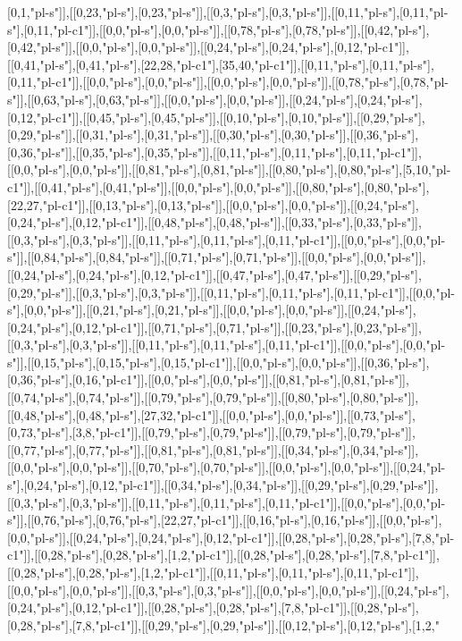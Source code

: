 [0,1,"pl-s"]],[[0,23,"pl-s"],[0,23,"pl-s"]],[[0,3,"pl-s"],[0,3,"pl-s"]],[[0,11,"pl-s"],[0,11,"pl-s"],[0,11,"pl-c1"]],[[0,0,"pl-s"],[0,0,"pl-s"]],[[0,78,"pl-s"],[0,78,"pl-s"]],[[0,42,"pl-s"],[0,42,"pl-s"]],[[0,0,"pl-s"],[0,0,"pl-s"]],[[0,24,"pl-s"],[0,24,"pl-s"],[0,12,"pl-c1"]],[[0,41,"pl-s"],[0,41,"pl-s"],[22,28,"pl-c1"],[35,40,"pl-c1"]],[[0,11,"pl-s"],[0,11,"pl-s"],[0,11,"pl-c1"]],[[0,0,"pl-s"],[0,0,"pl-s"]],[[0,0,"pl-s"],[0,0,"pl-s"]],[[0,78,"pl-s"],[0,78,"pl-s"]],[[0,63,"pl-s"],[0,63,"pl-s"]],[[0,0,"pl-s"],[0,0,"pl-s"]],[[0,24,"pl-s"],[0,24,"pl-s"],[0,12,"pl-c1"]],[[0,45,"pl-s"],[0,45,"pl-s"]],[[0,10,"pl-s"],[0,10,"pl-s"]],[[0,29,"pl-s"],[0,29,"pl-s"]],[[0,31,"pl-s"],[0,31,"pl-s"]],[[0,30,"pl-s"],[0,30,"pl-s"]],[[0,36,"pl-s"],[0,36,"pl-s"]],[[0,35,"pl-s"],[0,35,"pl-s"]],[[0,11,"pl-s"],[0,11,"pl-s"],[0,11,"pl-c1"]],[[0,0,"pl-s"],[0,0,"pl-s"]],[[0,81,"pl-s"],[0,81,"pl-s"]],[[0,80,"pl-s"],[0,80,"pl-s"],[5,10,"pl-c1"]],[[0,41,"pl-s"],[0,41,"pl-s"]],[[0,0,"pl-s"],[0,0,"pl-s"]],[[0,80,"pl-s"],[0,80,"pl-s"],[22,27,"pl-c1"]],[[0,13,"pl-s"],[0,13,"pl-s"]],[[0,0,"pl-s"],[0,0,"pl-s"]],[[0,24,"pl-s"],[0,24,"pl-s"],[0,12,"pl-c1"]],[[0,48,"pl-s"],[0,48,"pl-s"]],[[0,33,"pl-s"],[0,33,"pl-s"]],[[0,3,"pl-s"],[0,3,"pl-s"]],[[0,11,"pl-s"],[0,11,"pl-s"],[0,11,"pl-c1"]],[[0,0,"pl-s"],[0,0,"pl-s"]],[[0,84,"pl-s"],[0,84,"pl-s"]],[[0,71,"pl-s"],[0,71,"pl-s"]],[[0,0,"pl-s"],[0,0,"pl-s"]],[[0,24,"pl-s"],[0,24,"pl-s"],[0,12,"pl-c1"]],[[0,47,"pl-s"],[0,47,"pl-s"]],[[0,29,"pl-s"],[0,29,"pl-s"]],[[0,3,"pl-s"],[0,3,"pl-s"]],[[0,11,"pl-s"],[0,11,"pl-s"],[0,11,"pl-c1"]],[[0,0,"pl-s"],[0,0,"pl-s"]],[[0,21,"pl-s"],[0,21,"pl-s"]],[[0,0,"pl-s"],[0,0,"pl-s"]],[[0,24,"pl-s"],[0,24,"pl-s"],[0,12,"pl-c1"]],[[0,71,"pl-s"],[0,71,"pl-s"]],[[0,23,"pl-s"],[0,23,"pl-s"]],[[0,3,"pl-s"],[0,3,"pl-s"]],[[0,11,"pl-s"],[0,11,"pl-s"],[0,11,"pl-c1"]],[[0,0,"pl-s"],[0,0,"pl-s"]],[[0,15,"pl-s"],[0,15,"pl-s"],[0,15,"pl-c1"]],[[0,0,"pl-s"],[0,0,"pl-s"]],[[0,36,"pl-s"],[0,36,"pl-s"],[0,16,"pl-c1"]],[[0,0,"pl-s"],[0,0,"pl-s"]],[[0,81,"pl-s"],[0,81,"pl-s"]],[[0,74,"pl-s"],[0,74,"pl-s"]],[[0,79,"pl-s"],[0,79,"pl-s"]],[[0,80,"pl-s"],[0,80,"pl-s"]],[[0,48,"pl-s"],[0,48,"pl-s"],[27,32,"pl-c1"]],[[0,0,"pl-s"],[0,0,"pl-s"]],[[0,73,"pl-s"],[0,73,"pl-s"],[3,8,"pl-c1"]],[[0,79,"pl-s"],[0,79,"pl-s"]],[[0,79,"pl-s"],[0,79,"pl-s"]],[[0,77,"pl-s"],[0,77,"pl-s"]],[[0,81,"pl-s"],[0,81,"pl-s"]],[[0,34,"pl-s"],[0,34,"pl-s"]],[[0,0,"pl-s"],[0,0,"pl-s"]],[[0,70,"pl-s"],[0,70,"pl-s"]],[[0,0,"pl-s"],[0,0,"pl-s"]],[[0,24,"pl-s"],[0,24,"pl-s"],[0,12,"pl-c1"]],[[0,34,"pl-s"],[0,34,"pl-s"]],[[0,29,"pl-s"],[0,29,"pl-s"]],[[0,3,"pl-s"],[0,3,"pl-s"]],[[0,11,"pl-s"],[0,11,"pl-s"],[0,11,"pl-c1"]],[[0,0,"pl-s"],[0,0,"pl-s"]],[[0,76,"pl-s"],[0,76,"pl-s"],[22,27,"pl-c1"]],[[0,16,"pl-s"],[0,16,"pl-s"]],[[0,0,"pl-s"],[0,0,"pl-s"]],[[0,24,"pl-s"],[0,24,"pl-s"],[0,12,"pl-c1"]],[[0,28,"pl-s"],[0,28,"pl-s"],[7,8,"pl-c1"]],[[0,28,"pl-s"],[0,28,"pl-s"],[1,2,"pl-c1"]],[[0,28,"pl-s"],[0,28,"pl-s"],[7,8,"pl-c1"]],[[0,28,"pl-s"],[0,28,"pl-s"],[1,2,"pl-c1"]],[[0,11,"pl-s"],[0,11,"pl-s"],[0,11,"pl-c1"]],[[0,0,"pl-s"],[0,0,"pl-s"]],[[0,3,"pl-s"],[0,3,"pl-s"]],[[0,0,"pl-s"],[0,0,"pl-s"]],[[0,24,"pl-s"],[0,24,"pl-s"],[0,12,"pl-c1"]],[[0,28,"pl-s"],[0,28,"pl-s"],[7,8,"pl-c1"]],[[0,28,"pl-s"],[0,28,"pl-s"],[7,8,"pl-c1"]],[[0,29,"pl-s"],[0,29,"pl-s"]],[[0,12,"pl-s"],[0,12,"pl-s"],[1,2,"